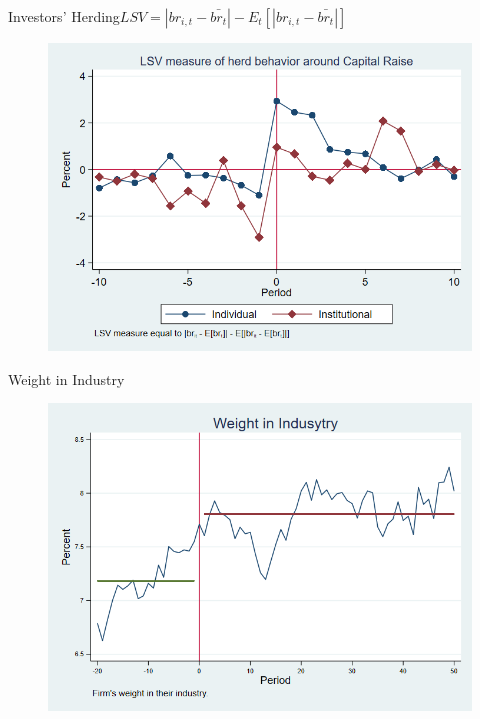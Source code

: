 \documentclass{beamer}
\begin{document}
	\begin{frame}{Investors' Herding}{$LSV =  |br_{i,t} - \bar{br_{t}}| - E_t[|br_{i,t} - \bar{br_{t}}|] $}
		\begin{figure}
			\centering
			\includegraphics[width=0.65\linewidth]{Output/IndInsHerd.png}
			\label{fig:IndInsHerd}
		\end{figure}
	\end{frame}
	
	\begin{frame}{Weight in Industry}
		\begin{figure}
			\centering
			\includegraphics[width=0.65\linewidth]{Output/weight}
			\label{fig:weight}
		\end{figure}
	\end{frame}
	
	
	
	
	
	
	
	
	
	
	
	
	
	
	
	
	
	
	
	
	
\end{document}
